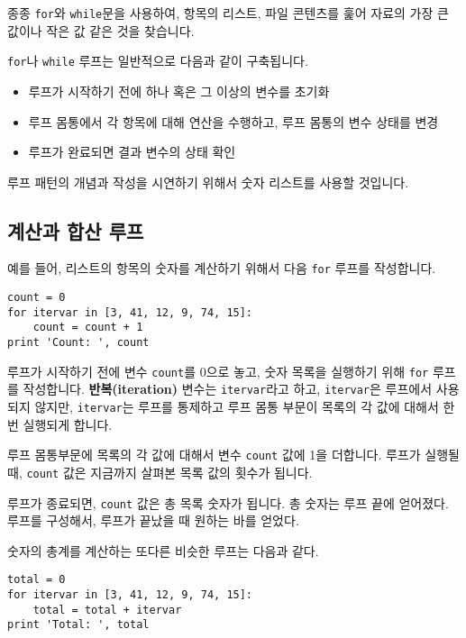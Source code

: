 종종 {\tt for}와 {\tt while}문을 사용하여, 항목의 리스트, 파일 콘텐츠를 훑어 자료의 가장 큰 값이나 작은 값 같은 것을 찾습니다.

{\tt for}나 {\tt while} 루프는 일반적으로 다음과 같이 구축됩니다.

\begin{itemize}

\item 루프가 시작하기 전에 하나 혹은 그 이상의 변수를 초기화

\item 루프 몸통에서 각 항목에 대해 연산을 수행하고, 루프 몸통의 변수 상태를 변경

\item 루프가 완료되면 결과 변수의 상태 확인

\end{itemize}

루프 패턴의 개념과 작성을 시연하기 위해서 숫자 리스트를 사용할 것입니다.

\subsection{계산과 합산 루프}

예를 들어, 리스트의 항목의 숫자를 계산하기 위해서 다음 {\tt for} 루프를 작성합니다.

\beforeverb
\begin{verbatim}
count = 0
for itervar in [3, 41, 12, 9, 74, 15]:
    count = count + 1
print 'Count: ', count
\end{verbatim}
\afterverb
%

루프가 시작하기 전에 변수 {\tt count}를 0으로 놓고, 숫자 목록을 실행하기 위해 {\tt for} 루프를 작성합니다.
{\bf 반복(iteration)} 변수는 {\tt itervar}라고 하고, {\tt itervar}은 루프에서 사용되지 않지만,
{\tt itervar}는 루프를 통제하고 루프 몸통 부문이 목록의 각 값에 대해서 한번 실행되게 합니다.

루프 몸통부문에 목록의 각 값에 대해서 변수 {\tt count} 값에 1을 더합니다.
루프가 실행될 때, {\tt count} 값은 지금까지 살펴본 목록 값의 횟수가 됩니다.

루프가 종료되면, {\tt count} 값은 총 목록 숫자가 됩니다. 총 숫자는 루프 끝에 얻어졌다.
루프를 구성해서, 루프가 끝났을 때 원하는 바를 얻었다.

숫자의 총계를 계산하는 또다른 비슷한 루프는 다음과 같다.

\beforeverb
\begin{verbatim}
total = 0
for itervar in [3, 41, 12, 9, 74, 15]:
    total = total + itervar
print 'Total: ', total
\end{verbatim}
\afterverb
%

